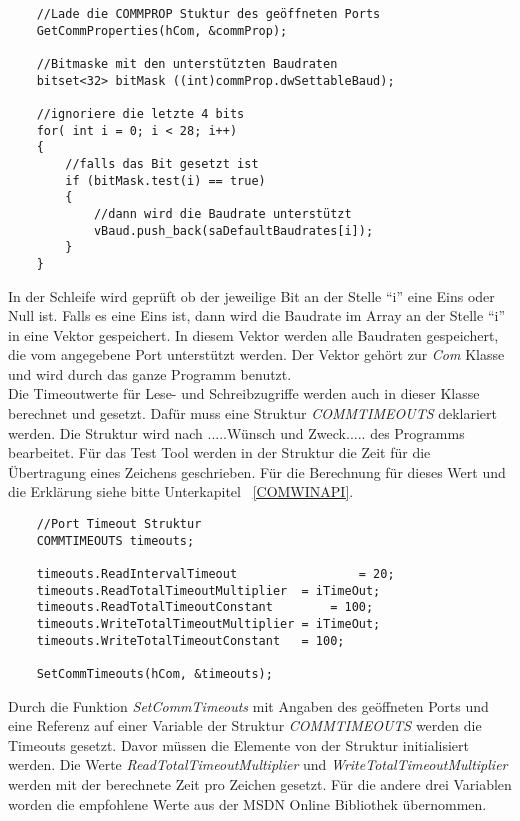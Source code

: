 \begin{lstlisting}
	//Lade die COMMPROP Stuktur des geöffneten Ports	 
	GetCommProperties(hCom, &commProp);
 
 	//Bitmaske mit den unterstützten Baudraten
	bitset<32> bitMask ((int)commProp.dwSettableBaud);
	
	//ignoriere die letzte 4 bits
	for( int i = 0; i < 28; i++)
	{
		//falls das Bit gesetzt ist
		if (bitMask.test(i) == true)
		{
			//dann wird die Baudrate unterstützt
			vBaud.push_back(saDefaultBaudrates[i]);
		}
	}
\end{lstlisting}

In der Schleife wird geprüft ob der jeweilige Bit an der Stelle "`i"' eine Eins oder Null ist. Falls es eine Eins ist, dann wird die Baudrate im Array an der Stelle "`i"' in eine Vektor gespeichert. In diesem Vektor werden alle Baudraten gespeichert, die vom angegebene Port unterstützt werden. Der Vektor gehört zur \textit{Com} Klasse und wird durch das ganze Programm benutzt.\\

Die Timeoutwerte für Lese- und Schreibzugriffe werden auch in dieser Klasse berechnet und gesetzt. Dafür muss eine  Struktur \textit{COMMTIMEOUTS} deklariert werden. Die Struktur wird nach .....Wünsch und Zweck..... des Programms bearbeitet. Für das Test Tool werden in der Struktur die Zeit für die Übertragung eines Zeichens geschrieben. Für die Berechnung für dieses Wert und die Erklärung siehe bitte Unterkapitel ~\ref{COMWINAPI}.

\begin{lstlisting}
	//Port Timeout Struktur
	COMMTIMEOUTS timeouts;
	
	timeouts.ReadIntervalTimeout				 = 20;
	timeouts.ReadTotalTimeoutMultiplier	 = iTimeOut;
	timeouts.ReadTotalTimeoutConstant		 = 100;
	timeouts.WriteTotalTimeoutMultiplier = iTimeOut;
	timeouts.WriteTotalTimeoutConstant	 = 100;
	
	SetCommTimeouts(hCom, &timeouts);
\end{lstlisting}

Durch die Funktion \textit{SetCommTimeouts} mit Angaben des geöffneten Ports und eine Referenz auf einer Variable der Struktur \textit{COMMTIMEOUTS} werden die Timeouts gesetzt. Davor müssen die Elemente von der Struktur initialisiert werden. Die Werte \textit{ReadTotalTimeoutMultiplier} und \textit{WriteTotalTimeoutMultiplier} werden mit der berechnete Zeit pro Zeichen gesetzt. Für die andere drei Variablen worden die empfohlene Werte aus der MSDN Online Bibliothek\cite{SerialCommunications} übernommen. \\

